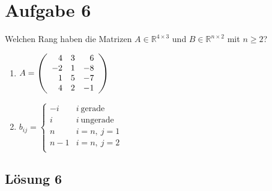 \documentclass[main.tex]{subfiles}
\begin{document}
\section{Aufgabe 6}
Welchen Rang haben die Matrizen $A\in \mathbb{R}^{4\times 3}$ und $B\in \mathbb{R}^{n\times 2}$ mit $n\geq 2$?

\begin{enumerate}
    \item $A=\eqmatrix{rrr}{
        4 & 3 & 6 \\
        -2 & 1 & -8 \\
        1 & 5 & -7 \\
        4 & 2 & -1 \\
    }$ \\
    \item $b_{ij} = \begin{cases}
        -i & i\  \text{gerade} \\
         i & i\  \text{ungerade} \\
         n & i=n,\  j=1 \\
         n-1 & i=n,\  j=2 \\
    \end{cases}$
\end{enumerate}

\subsection{Lösung 6}
\end{document}
